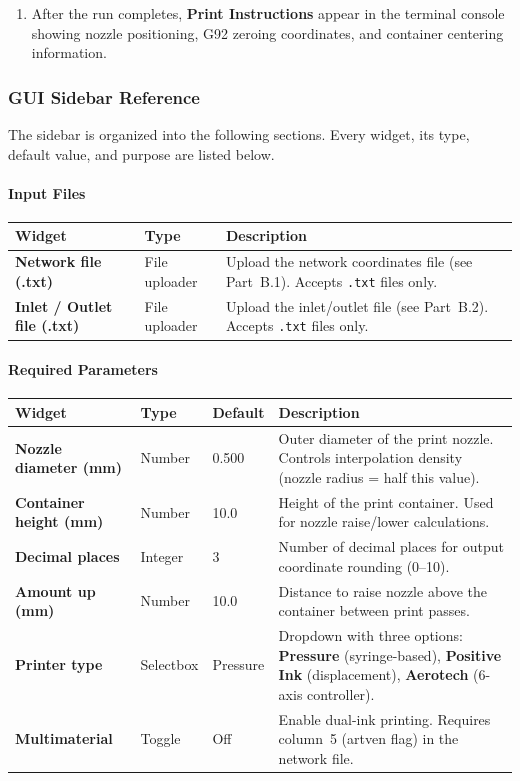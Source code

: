 \documentclass[11pt,letterpaper]{article}
\newcommand{\code}[1]{\texttt{#1}}
\newcommand{\gui}[1]{\textcolor{guicolor}{\textsf{\textbf{#1}}}}
\begin{document}
\begin{enumerate}
    \item After the run completes, \textbf{Print Instructions} appear in the terminal console showing nozzle positioning, G92 zeroing coordinates, and container centering information.
\end{enumerate}

\subsubsection{GUI Sidebar Reference}
\label{sec:gui-sidebar}

The sidebar is organized into the following sections. Every widget, its type, default value, and purpose are listed below.

\paragraph{Input Files}

\begin{longtable}{@{}L{3.5cm} l L{7cm}@{}}
\toprule
\textbf{Widget} & \textbf{Type} & \textbf{Description} \\
\midrule
\gui{Network file (.txt)} & File uploader & Upload the network coordinates file (see Part~B.1). Accepts \code{.txt} files only. \\
\gui{Inlet / Outlet file (.txt)} & File uploader & Upload the inlet/outlet file (see Part~B.2). Accepts \code{.txt} files only. \\
\bottomrule
\end{longtable}

\paragraph{Required Parameters}

\begin{longtable}{@{}L{3.5cm} l l L{5cm}@{}}
\toprule
\textbf{Widget} & \textbf{Type} & \textbf{Default} & \textbf{Description} \\
\midrule
\gui{Nozzle diameter (mm)} & Number & 0.500 & Outer diameter of the print nozzle. Controls interpolation density (nozzle radius = half this value). \\
\gui{Container height (mm)} & Number & 10.0 & Height of the print container. Used for nozzle raise/lower calculations. \\
\gui{Decimal places} & Integer & 3 & Number of decimal places for output coordinate rounding (0--10). \\
\gui{Amount up (mm)} & Number & 10.0 & Distance to raise nozzle above the container between print passes. \\
\gui{Printer type} & Selectbox & Pressure & Dropdown with three options: \textbf{Pressure} (syringe-based), \textbf{Positive Ink} (displacement), \textbf{Aerotech} (6-axis controller). \\
\gui{Multimaterial} & Toggle & Off & Enable dual-ink printing. Requires column~5 (artven flag) in the network file. \\
\bottomrule
\end{longtable}
\end{document}
